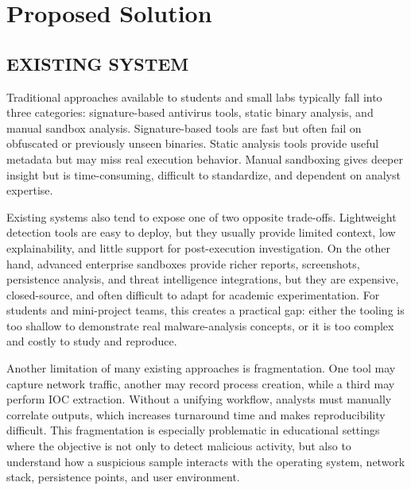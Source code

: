 \documentclass[a4paper,12pt,oneside]{report}
\begin{document}
\section{Proposed Solution}
\subsection{EXISTING SYSTEM}
Traditional approaches available to students and small labs typically fall into three categories: signature-based antivirus tools, static binary analysis, and manual sandbox analysis. Signature-based tools are fast but often fail on obfuscated or previously unseen binaries. Static analysis tools provide useful metadata but may miss real execution behavior. Manual sandboxing gives deeper insight but is time-consuming, difficult to standardize, and dependent on analyst expertise.

\par

\par

Existing systems also tend to expose one of two opposite trade-offs. Lightweight detection tools are easy to deploy, but they usually provide limited context, low explainability, and little support for post-execution investigation. On the other hand, advanced enterprise sandboxes provide richer reports, screenshots, persistence analysis, and threat intelligence integrations, but they are expensive, closed-source, and often difficult to adapt for academic experimentation. For students and mini-project teams, this creates a practical gap: either the tooling is too shallow to demonstrate real malware-analysis concepts, or it is too complex and costly to study and reproduce.

\par

\par

Another limitation of many existing approaches is fragmentation. One tool may capture network traffic, another may record process creation, while a third may perform IOC extraction. Without a unifying workflow, analysts must manually correlate outputs, which increases turnaround time and makes reproducibility difficult. This fragmentation is especially problematic in educational settings where the objective is not only to detect malicious activity, but also to understand how a suspicious sample interacts with the operating system, network stack, persistence points, and user environment.
\end{document}
